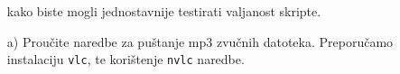 \documentclass{exam}
\newcommand{\shell}[1]{\texttt{#1}}
\begin{document}
\begin{itemize}
                                                                                                                 kako
                                                                                                                 biste
                                                                                                                 mogli
                                                                                                                 jednostavnije
                                                                                                                 testirati
                                                                                                                 valjanost
                                                                                                                 skripte.
                                                                                                                    \item[a)]Proučite
                                                                                                                        naredbe
                                                                                                                        za
                                                                                                                        puštanje
                                                                                                                        mp3
                                                                                                                        zvučnih
                                                                                                                        datoteka.
                                                                                                                        Preporučamo
                                                                                                                        instalaciju
                                                                                                                        \shell{vlc},
                                                                                                                        te
                                                                                                                        korištenje
                                                                                                                        \shell{nvlc}
                                                                                                                        naredbe.

\end{itemize}
\end{document}
